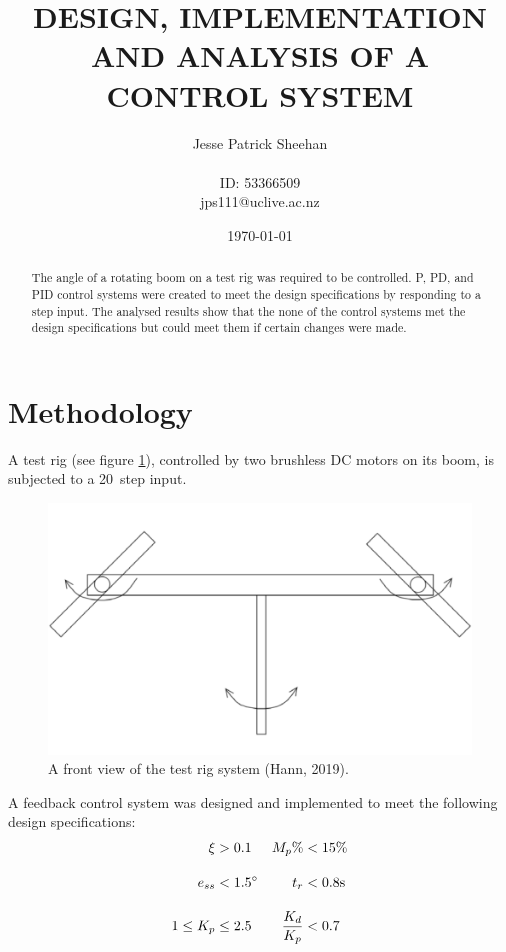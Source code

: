 \documentclass[12pt]{article} %
\title{\uppercase{
	Design, Implementation and Analysis of a Control System
}}
\date{\today}
\author{
	Jesse Patrick Sheehan\\
	\\
	{\small{ID: 53366509}}\\
	{\small{jps111@uclive.ac.nz}}\\
}
\begin{document}
\maketitle

\vfill

\begin{abstract}


\noindent The angle of a rotating boom on a test rig was required to be controlled.
P, PD, and PID control systems were created to meet the design specifications by responding to a step input.
The analysed results show that the none of the control systems met the design specifications but could meet them if certain changes were made.

\end{abstract}

\newpage

\section*{Methodology}

A test rig (see figure \ref{fig:test-rig}), controlled by two brushless DC motors on its boom, is subjected to a 20\degree\ step input.

\begin{figure}[H]
	\centering
	\includegraphics[scale=0.8]{test-rig}
	\caption{A front view of the test rig system (Hann, 2019).}
	\label{fig:test-rig}
\end{figure}

\noindent A feedback control system was designed and implemented to meet the following design specifications:
\begin{align*}
\xi &> 0.1 & M_p\% &< 15\%  \\[1em]
e_{ss} &< 1.5\degree & t_r &< 0.8 \textrm{s} \\[1em]
1 \leq K_p &\leq 2.5 & \frac{K_d}{K_p} &< 0.7
\end{align*}
\end{document}
